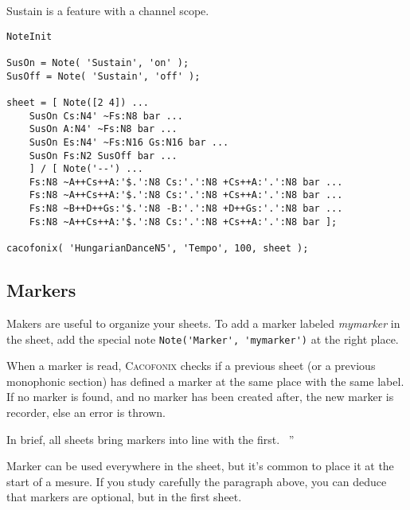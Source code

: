 \documentclass{article}
\newcommand\cacofonix{\textsc{Cacofonix}\xspace}
\newenvironment{meenv}{ \par \noindent \makebox[6em][r]{ \textcolor{mecolor}{Me}: `` --~}}{~''}
\newcommand{ \me }[1]{%
\begin{meenv}%
	#1%
\end{meenv} }
\begin{document}
Sustain is a feature with a channel scope.

\begin{lstlisting}
NoteInit

SusOn = Note( 'Sustain', 'on' );
SusOff = Note( 'Sustain', 'off' );

sheet = [ Note([2 4]) ...
	SusOn Cs:N4' ~Fs:N8 bar ...
	SusOn A:N4' ~Fs:N8 bar ...
	SusOn Es:N4' ~Fs:N16 Gs:N16 bar ...
	SusOn Fs:N2 SusOff bar ...
	] / [ Note('--') ...
	Fs:N8 ~A++Cs++A:'$.':N8 Cs:'.':N8 +Cs++A:'.':N8 bar ...
	Fs:N8 ~A++Cs++A:'$.':N8 Cs:'.':N8 +Cs++A:'.':N8 bar ...
	Fs:N8 ~B++D++Gs:'$.':N8 -B:'.':N8 +D++Gs:'.':N8 bar ...
	Fs:N8 ~A++Cs++A:'$.':N8 Cs:'.':N8 +Cs++A:'.':N8 bar ];

cacofonix( 'HungarianDanceN5', 'Tempo', 100, sheet );
\end{lstlisting}

\subsection{Markers}
\label{sec:Markers}

Makers are useful to organize your sheets. To add a marker labeled \emph{mymarker} in the sheet, add the special note \lstinline!Note('Marker', 'mymarker')! at the right place.

When a marker is read, \cacofonix checks if a previous sheet (or a previous monophonic section) has defined a marker at the same place with the same label. If no marker is found, and no marker has been created after, the new marker is recorder, else an error is thrown.
\me{In brief, all sheets bring markers into line with the first.}

Marker can be used everywhere in the sheet, but it's common to place it at the start of a mesure. If you study carefully the paragraph above, you can deduce that markers are optional, but in the first sheet.
\end{document}

